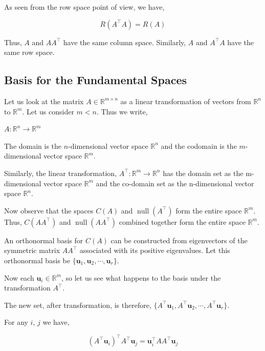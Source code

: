\documentclass[a4paper]{article}
\begin{document}
As seen from the row space point of view, we have,

\begin{equation}
R(A^{\top}A) = R(A)
\end{equation}

Thus, $A$ and $AA^{\top}$ have the same column space. Similarly, $A$ and $A^{\top}A$ have the same row space.

\subsection{Basis for the Fundamental Spaces}

Let us look at the matrix $A \in \mathbb{R}^{m \times n}$ as a linear transformation of vectors from $\mathbb{R}^n$ to $\mathbb{R}^m$. Let us consider $m<n$. Thus we write,

$A: \mathbb{R}^n \rightarrow \mathbb{R}^m$

The domain is the $n$-dimensional vector space $\mathbb{R}^n$ and the codomain is the $m$-dimensional vector space $\mathbb{R}^m$.

Similarly, the linear transformation, $A^{\top}: \mathbb{R}^m \rightarrow \mathbb{R}^n$ has the domain set as the m-dimensional vector space $\mathbb{R}^m$ and the co-domain set as the n-dimensional vector space $\mathbb{R}^n$.

Now observe that the spaces $C(A)$ and $\operatorname{null}(A^{\top})$ form the entire space $\mathbb{R}^m$. Thus, $C(AA^{\top})$ and $\operatorname{null}(AA^{\top})$ combined together form the entire space $\mathbb{R}^m$.

An orthonormal basis for $C(A)$ can be constructed from eigenvectors of the symmetric matrix $AA^{\top}$ associated with its positive eigenvalues. Let this orthonormal basis be $\{ \boldsymbol{u}_1, \boldsymbol{u}_2, \cdots, \boldsymbol{u}_r \}$. 

Now each $\boldsymbol{u}_i \in \mathbb{R}^m$, so let us see what happens to the basis under the transformation $A^{\top}$.

The new set, after transformation, is therefore, $\{ A^{\top}\boldsymbol{u}_1, A^{\top}\boldsymbol{u}_2, \cdots, A^{\top}\boldsymbol{u}_r \}$.

For any $i$, $j$ we have,

\begin{equation}
\left(A^{\top}\boldsymbol{u}_i \right)^{\top} A^{\top}\boldsymbol{u}_j = \boldsymbol{u}_i^{\top}AA^{\top}\boldsymbol{u}_j 
\label{eq:me}
\end{equation}
\end{document}
